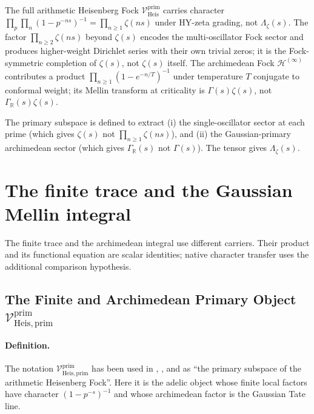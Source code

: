 \begin{remark}
\label{v4-arith:prim-zeta:rem:why-primary}
The full arithmetic Heisenberg Fock
\(\mathcal{V}^{\mathrm{prim}}_{\mathrm{Heis}}\) carries character
\(\prod_{p}\prod_{n}(1-p^{-ns})^{-1}=\prod_{n\geq 1}\zeta(ns)\) under
HY-zeta grading, not \(\Lambda_{\zeta}(s)\). The factor
\(\prod_{n\geq 2}\zeta(ns)\) beyond \(\zeta(s)\) encodes the
multi-oscillator Fock sector and produces higher-weight Dirichlet
series with their own trivial zeros; it is the Fock-symmetric
completion of \(\zeta(s)\), not \(\zeta(s)\) itself. The archimedean
Fock \(\mathcal{H}^{(\infty)}\) contributes a product
\(\prod_{n\geq 1}(1-e^{-n/T})^{-1}\) under temperature \(T\) conjugate to
conformal weight; its Mellin transform at criticality is
\(\Gamma(s)\zeta(s)\), not \(\Gamma_{\mathbb{R}}(s)\zeta(s)\).

The primary subspace is defined to extract (i) the single-oscillator
sector at each prime (which gives \(\zeta(s)\) not
\(\prod_{n\geq 1}\zeta(ns)\)), and (ii) the Gaussian-primary archimedean
sector (which gives \(\Gamma_{\mathbb{R}}(s)\) not \(\Gamma(s)\)). The
tensor gives \(\Lambda_{\zeta}(s)\).
\end{remark}

\section{The finite trace and the Gaussian Mellin integral}
\label{v4-arith:prim-zeta:table}

The finite trace and the archimedean integral use different carriers.
Their product and its functional equation are scalar identities; native
character transfer uses the additional comparison hypothesis.

\subsection{The Finite and Archimedean Primary Object
\texorpdfstring{\(\mathcal{V}^{\mathrm{prim}}_{\mathrm{Heis},\mathrm{prim}}\)}{V\^{}prim\_{Heis,prim}}}
\label{v4-arith:prim-zeta:att-1-primary}

\paragraph{Definition.} The notation
\(\mathcal{V}^{\mathrm{prim}}_{\mathrm{Heis},\mathrm{prim}}\) has been
used in
,
, and
 as ``the primary subspace of
the arithmetic Heisenberg Fock''.  Here it is the adelic object whose
finite local factors have character \((1-p^{-s})^{-1}\) and whose
archimedean factor is the Gaussian Tate line.

